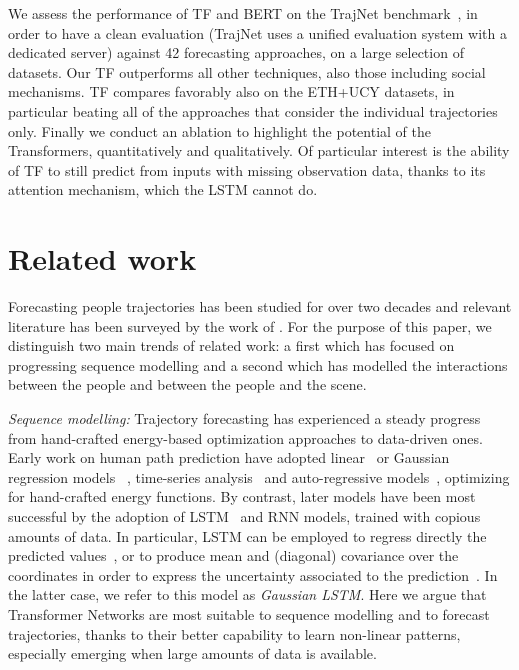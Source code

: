 \documentclass[a4paper,conference]{IEEEtran}
\begin{document}
We assess the performance of TF and BERT on the TrajNet benchmark~\cite{sadeghiankosaraju2018trajnet}, in order to have a clean evaluation (TrajNet uses a unified evaluation system with a dedicated server) against 42 forecasting approaches, on a large selection of datasets.
Our TF outperforms all other techniques, also those including social mechanisms. TF compares favorably also on the ETH+UCY datasets, in particular beating all of the approaches that consider the individual trajectories only. Finally we conduct an ablation to highlight the potential of the Transformers, quantitatively and qualitatively. Of particular interest is the ability of TF to still predict from inputs with missing observation data, thanks to its attention mechanism, which the LSTM cannot do.










\vspace{-0.2cm}



 \section{Related work}
\label{sec:prev}





Forecasting people trajectories has been studied for over two decades and relevant literature has been surveyed by the work of \cite{becker2018evaluation,morris2008survey}.
For the purpose of this paper, we distinguish two main trends of related work: a first which has focused on progressing sequence modelling and a second which has modelled the interactions between the people and between the people and the scene.

\noindent\textit{Sequence modelling:}
Trajectory forecasting has experienced a steady progress from hand-crafted energy-based optimization approaches to data-driven ones.
Early work on human path prediction have adopted linear~\cite{mccullagh1989generalized} or Gaussian regression models ~\cite{quinonero2005unifying,williams1998prediction}, time-series analysis~\cite{priestley1981spectral} and auto-regressive models~\cite{akaike1969fitting}, optimizing for hand-crafted energy functions. By contrast, later models have been most successful by the adoption of LSTM~\cite{hochreiter1997long} and RNN models, trained with copious amounts of data.
In particular, LSTM can be employed to regress directly the predicted values~\cite{becker2018red,gupta2018social,salzmann2020trajectron++}, or to produce mean and (diagonal) covariance over the  coordinates in order to express the uncertainty associated to the prediction~\cite{alahi2016cvpr}. In the latter case, we refer to this model as \emph{Gaussian LSTM}.
Here we argue that Transformer Networks are most suitable to sequence modelling and to forecast trajectories, thanks to their better capability to learn non-linear patterns, especially emerging when large amounts of data is available.
\end{document}
